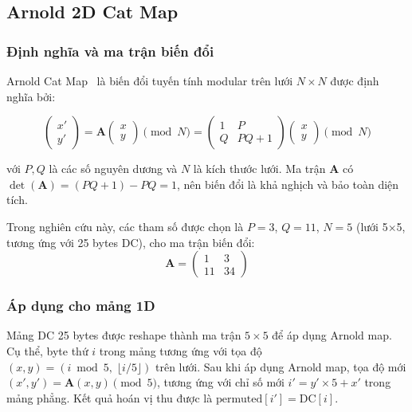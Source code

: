 \subsection{Arnold 2D Cat Map}

\subsubsection{Định nghĩa và ma trận biến đổi}

Arnold Cat Map~\cite{arnold_catmap} là biến đổi tuyến tính modular trên lưới
$N \times N$ được định nghĩa bởi:

\begin{equation}
\begin{pmatrix} x' \\ y' \end{pmatrix}
= \mathbf{A} \begin{pmatrix} x \\ y \end{pmatrix} \pmod{N}
= \begin{pmatrix} 1 & P \\ Q & PQ+1 \end{pmatrix}
\begin{pmatrix} x \\ y \end{pmatrix} \pmod{N}
\label{eq:arnold}
\end{equation}

với $P, Q$ là các số nguyên dương và $N$ là kích thước lưới. Ma trận $\mathbf{A}$
có $\det(\mathbf{A}) = (PQ+1) - PQ = 1$, nên biến đổi là khả nghịch và bảo toàn diện tích.

Trong nghiên cứu này, các tham số được chọn là $P = 3$, $Q = 11$, $N = 5$ (lưới 5$\times$5, tương ứng với 25 bytes DC), cho ma trận biến đổi:
\begin{equation}
\mathbf{A} = \begin{pmatrix} 1 & 3 \\ 11 & 34 \end{pmatrix}
\end{equation}

\subsubsection{Áp dụng cho mảng 1D}

Mảng DC 25 bytes được reshape thành ma trận $5 \times 5$ để áp dụng Arnold map. Cụ thể, byte thứ $i$ trong mảng tương ứng với tọa độ $(x, y) = (i \bmod 5,\; \lfloor i/5 \rfloor)$ trên lưới. Sau khi áp dụng Arnold map, tọa độ mới $(x', y') = \mathbf{A}(x, y) \pmod{5}$, tương ứng với chỉ số mới $i' = y' \times 5 + x'$ trong mảng phẳng. Kết quả hoán vị thu được là $\text{permuted}[i'] = \text{DC}[i]$.

